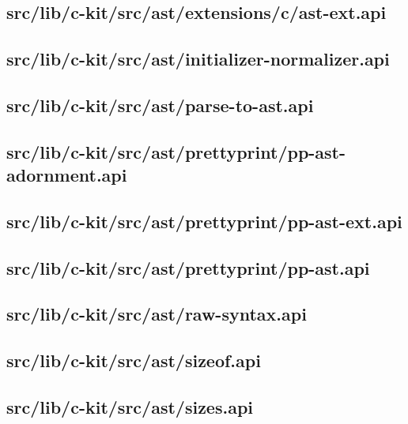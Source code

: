 \subsection{src/lib/c-kit/src/ast/extensions/c/ast-ext.api}


\subsection{src/lib/c-kit/src/ast/initializer-normalizer.api}


\subsection{src/lib/c-kit/src/ast/parse-to-ast.api}


\subsection{src/lib/c-kit/src/ast/prettyprint/pp-ast-adornment.api}


\subsection{src/lib/c-kit/src/ast/prettyprint/pp-ast-ext.api}


\subsection{src/lib/c-kit/src/ast/prettyprint/pp-ast.api}


\subsection{src/lib/c-kit/src/ast/raw-syntax.api}


\subsection{src/lib/c-kit/src/ast/sizeof.api}


\subsection{src/lib/c-kit/src/ast/sizes.api}



